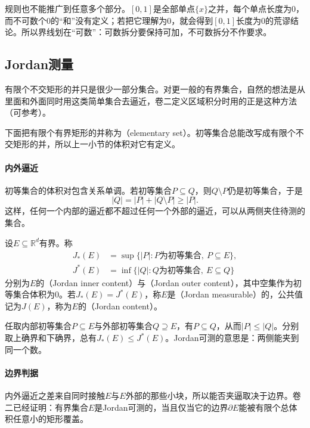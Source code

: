 规则也不能推广到任意多个部分。$[0,1]$是全部单点$\{x\}$之并，每个单点长度为$0$，而不可数个$0$的“和”没有定义；若把它理解为$0$，就会得到$[0,1]$长度为$0$的荒谬结论。所以界线划在“可数”：可数拆分要保持可加，不可数拆分不作要求。

\subsection{Jordan测量}
\label{sec:meas-jordan}

有限个不交矩形的并只是很少一部分集合。对更一般的有界集合，自然的想法是从里面和外面同时用这类简单集合去逼近，卷二定义区域积分时用的正是这种方法（可参考）。

下面把有限个有界矩形的并称为（elementary set）。初等集合总能改写成有限个不交矩形的并，所以上一小节的体积对它有定义。

\paragraph{内外逼近}
初等集合的体积对包含关系单调。若初等集合$P\subseteq Q$，则$Q\setminus P$仍是初等集合，于是
\[
 \lvert Q\rvert=\lvert P\rvert+\lvert Q\setminus P\rvert\geq\lvert P\rvert.
\]
这样，任何一个内部的逼近都不超过任何一个外部的逼近，可以从两侧夹住待测的集合。

\begin{definition}[Jordan测量]
\label{def:meas-jordan}
设$E\subseteq\mathbb R^d$有界。称
\begin{equation}
 \begin{aligned}
  J_*(E)&=\sup\{\lvert P\rvert:P\text{为初等集合},\ P\subseteq E\},\\
  J^*(E)&=\inf\{\lvert Q\rvert:Q\text{为初等集合},\ E\subseteq Q\}
 \end{aligned}
 \label{eq:meas-jordan-content}
\end{equation}
分别为$E$的（Jordan inner content）与（Jordan outer content），其中空集作为初等集合体积为$0$。若$J_*(E)=J^*(E)$，称$E$是（Jordan measurable）的，公共值记为$J(E)$，称为$E$的（Jordan content）。
\end{definition}

任取内部初等集合$P\subseteq E$与外部初等集合$Q\supseteq E$，有$P\subseteq Q$，从而$\lvert P\rvert\leq\lvert Q\rvert$。分别取上确界和下确界，总有$J_*(E)\leq J^*(E)$。Jordan可测的意思是：两侧能夹到同一个数。

\paragraph{边界判据}
内外逼近之差来自同时接触$E$与$E$外部的那些小块，所以能否夹逼取决于边界。卷二已经证明：有界集合$E$是Jordan可测的，当且仅当它的边界$\partial E$能被有限个总体积任意小的矩形覆盖。

